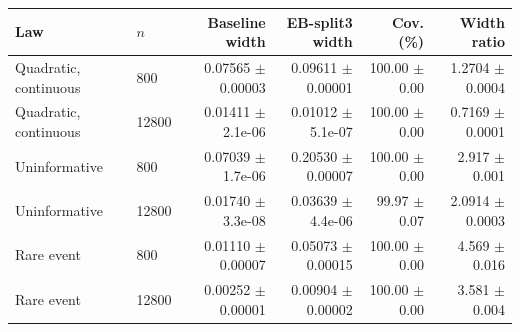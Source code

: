 \small
\begin{tabular}{llrrrr}
\toprule
Law & $n$ & Baseline width & EB-split3 width & Cov. (\%) & Width ratio \\
\midrule
Quadratic, continuous & 800 & 0.07565 $\pm$ 0.00003 & 0.09611 $\pm$ 0.00001 & 100.00 $\pm$ 0.00 & 1.2704 $\pm$ 0.0004 \\
Quadratic, continuous & 12800 & 0.01411 $\pm$ 2.1e-06 & 0.01012 $\pm$ 5.1e-07 & 100.00 $\pm$ 0.00 & 0.7169 $\pm$ 0.0001 \\
Uninformative & 800 & 0.07039 $\pm$ 1.7e-06 & 0.20530 $\pm$ 0.00007 & 100.00 $\pm$ 0.00 & 2.917 $\pm$ 0.001 \\
Uninformative & 12800 & 0.01740 $\pm$ 3.3e-08 & 0.03639 $\pm$ 4.4e-06 & 99.97 $\pm$ 0.07 & 2.0914 $\pm$ 0.0003 \\
Rare event & 800 & 0.01110 $\pm$ 0.00007 & 0.05073 $\pm$ 0.00015 & 100.00 $\pm$ 0.00 & 4.569 $\pm$ 0.016 \\
Rare event & 12800 & 0.00252 $\pm$ 0.00001 & 0.00904 $\pm$ 0.00002 & 100.00 $\pm$ 0.00 & 3.581 $\pm$ 0.004 \\
\bottomrule
\end{tabular}
